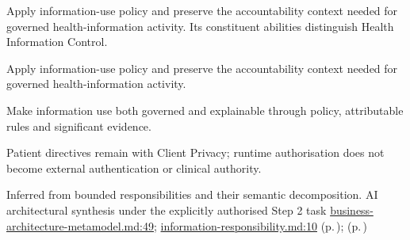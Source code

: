 Apply information-use policy and preserve the accountability context needed for governed health-information activity. Its constituent abilities distinguish Health Information Control.



Apply information-use policy and preserve the accountability context needed for governed health-information activity.



Make information use both governed and explainable through policy, attributable rules and significant evidence.



Patient directives remain with Client Privacy; runtime authorisation does not become external authentication or clinical authority.


Inferred from bounded responsibilities and their semantic decomposition. AI architectural synthesis under the explicitly authorised Step 2 task \hyperref[evidence:4bac85accd34ce0b]{business-architecture-metamodel.md:49}; \hyperref[evidence:be61392fefb4bb10]{information-responsibility.md:10}
 (p.\,\pageref{cap:bec-health-information-control});  (p.\,\pageref{cap:bec-reviewed-information-content-maintainer-management})
